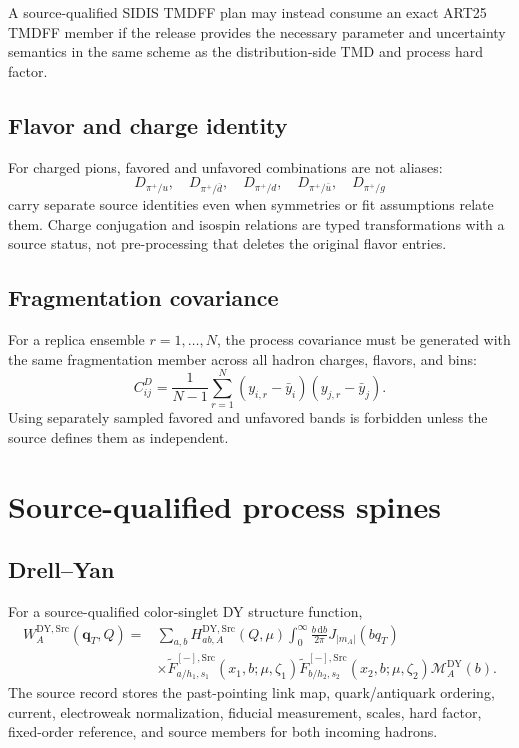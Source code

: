 \documentclass[11pt]{article}
\newcommand{\dd}{\mathrm{d}}
\newcommand{\DY}{\ensuremath{\mathrm{DY}}}
\newcommand{\qT}{\bm q_T}
\newcommand{\cM}{\mathcal M}
\newcommand{\Src}{\ensuremath{\mathrm{Src}}}
\begin{document}
A source-qualified SIDIS TMDFF plan may instead consume an exact ART25 TMDFF member if the release provides the necessary parameter and uncertainty semantics in the same scheme as the distribution-side TMD and process hard factor.

\subsection{Flavor and charge identity}

For charged pions, favored and unfavored combinations are not aliases:
\begin{equation}
 D_{\pi^+/u},\quad
 D_{\pi^+/\bar d},\quad
 D_{\pi^+/d},\quad
 D_{\pi^+/\bar u},\quad
 D_{\pi^+/g}
 \label{eq:ff-flavor-set}
\end{equation}
carry separate source identities even when symmetries or fit assumptions relate them.  Charge conjugation and isospin relations are typed transformations with a source status, not pre-processing that deletes the original flavor entries.

\subsection{Fragmentation covariance}

For a replica ensemble \(r=1,\ldots,N\), the process covariance must be generated with the same fragmentation member across all hadron charges, flavors, and bins:
\begin{equation}
 C_{ij}^{D}
 =
 \frac{1}{N-1}
 \sum_{r=1}^N
 \left(y_{i,r}-\bar y_i\right)
 \left(y_{j,r}-\bar y_j\right).
 \label{eq:ff-covariance}
\end{equation}
Using separately sampled favored and unfavored bands is forbidden unless the source defines them as independent.

\section{Source-qualified process spines}
\label{sec:process-spines}

\subsection{Drell--Yan}

For a source-qualified color-singlet DY structure function,
\begin{align}
 W_A^{\DY,\Src}(\qT,Q)
 ={}&
 \sum_{a,b}
 H_{ab,A}^{\DY,\Src}(Q,\mu)
 \int_0^\infty\frac{b\,\dd b}{2\pi}
 J_{|m_A|}(bq_T)
 \nonumber\\
 &\times
 \widetilde F_{a/h_1,s_1}^{[-],\Src}
 (x_1,b;\mu,\zeta_1)
 \widetilde F_{b/h_2,s_2}^{[-],\Src}
 (x_2,b;\mu,\zeta_2)
 \cM_A^{\DY}(b).
 \label{eq:source-dy-w}
\end{align}
The source record stores the past-pointing link map, quark/antiquark ordering, current, electroweak normalization, fiducial measurement, scales, hard factor, fixed-order reference, and source members for both incoming hadrons.
\end{document}
